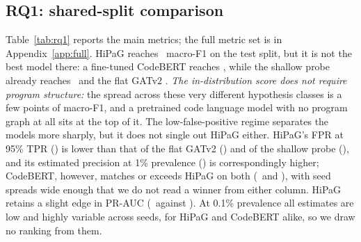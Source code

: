 \documentclass[pdflatex,sn-mathphys-num]{sn-jnl}
\begin{document}
\subsection{RQ1: shared-split comparison}\label{sec:r-rq1}
Table~\ref{tab:rq1} reports the main metrics; the full metric set is in
Appendix~\ref{app:full}. HiPaG reaches \HiPaGTestFOneMacro\ macro-F1 on the
test split, but it is not the best model there: a fine-tuned CodeBERT reaches
\RqOneCodeBertTestFOneMacro, while the shallow probe already reaches
\RqOneShallowTestFOneMacro\ and the flat GATv2 \RqOneFlatGatvTwoTestFOneMacro.
\emph{The in-distribution score does not require program structure:} the spread
across these very different hypothesis classes is a few points of macro-F1, and
a pretrained code language model with no program graph at all sits at the top
of it.
The low-false-positive regime separates the models more sharply, but it does
not single out HiPaG either. HiPaG's FPR at 95\% TPR
(\HiPaGTestFprAtTprNineFive) is lower than that of the flat GATv2
(\RqOneFlatGatvTwoTestFprAtTprNineFive) and of the shallow probe
(\RqOneShallowTestFprAtTprNineFive), and its estimated precision at 1\%
prevalence (\HiPaGTestPrecAtBaseOnePct) is correspondingly higher; CodeBERT,
however, matches or exceeds HiPaG on both (\RqOneCodeBertTestFprAtTprNineFive\
and \RqOneCodeBertTestPrecAtBaseOnePct), with seed spreads wide enough that we
do not read a winner from either column. HiPaG retains a slight edge in PR-AUC
(\HiPaGTestPrAuc\ against \RqOneCodeBertTestPrAuc). At 0.1\% prevalence all
estimates are low and highly variable across seeds, for HiPaG and CodeBERT
alike, so we draw no ranking from them.
\end{document}
